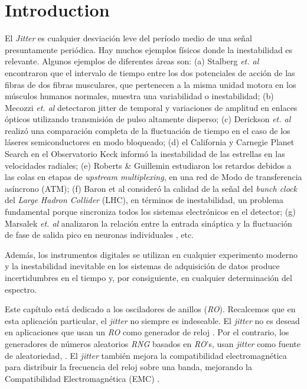 \section{Introduction}
\label{sec:intro}

El \emph{Jitter} es cualquier desviación leve del período medio de una señal presuntamente periódica.
Hay muchos ejemplos físicos donde la inestabilidad es relevante.
Algunos ejemplos de diferentes áreas son:
(a) Stalberg \textit{et. al} \cite{Stalberg1971} encontraron que el intervalo de tiempo entre los dos potenciales de acción de las fibras de dos fibras musculares, que pertenecen a la misma unidad motora en los músculos humanos normales, muestra una variabilidad o inestabilidad;
(b) Mecozzi \textit{et. al} \cite{Mecozzi2001} detectaron jitter de temporal y variaciones de amplitud en enlaces ópticos utilizando transmisión de pulso altamente disperso;
(c) Derickson \textit{et. al} \cite{Derickson1991} realizó una comparación completa de la fluctuación de tiempo en el caso de los láseres semiconductores en modo bloqueado;
(d) el California y Carnegie Planet Search en el Observatorio Keck \cite{Wright2005} informó la inestabilidad de las estrellas en las velocidades radiales;
(e) Roberts \& Guillemin estudiaron los retardos debidos a las colas en etapas de \textit{upstream multiplexing}, en una red de Modo de transferencia asíncrono (ATM);
(f) Baron et al \cite{Baron2012} consideró la calidad de la señal del \textit{bunch clock} del \textit{Large Hadron Collider} (LHC), en términos de inestabilidad, un problema fundamental porque sincroniza todos los sistemas electrónicos en el detector;
(g) Marsalek \textit{et. al} analizaron la relación entre la entrada sináptica y la fluctuación de fase de salida pico en neuronas individuales \cite{Marsalek1997}, etc.

Además, los instrumentos digitales se utilizan en cualquier experimento moderno y la inestabilidad inevitable en los sistemas de adquisición de datos produce incertidumbres en el tiempo y, por consiguiente, en cualquier determinación del espectro.

Este capítulo está dedicado a los osciladores de anillos (\emph{RO}).
Recalcemos que en esta aplicación particular, el \textit{jitter} no siempre es indeseable.
El \textit{jitter} no es desead en aplicaciones que usan un \emph{RO} como generador de reloj \cite{Buedo1998, Beomsup1990, Hajimiri1999, Mandal2010, Gupta2011}.
Por el contrario, los generadores de números aleatorios \emph{RNG} basados en \emph{RO}'s, usan \textit{jitter} como fuente de aleatoriedad, \cite{Sunar2007, Wold2009}.
El \textit{jitter} también mejora la compatibilidad electromagnética para distribuir la frecuencia del reloj sobre una banda, mejorando la Compatibilidad Electromagnética (EMC) \cite{DeMicco2012}.

